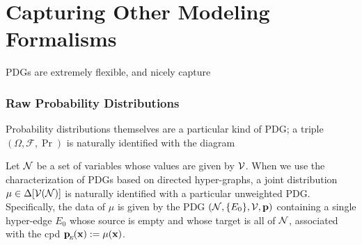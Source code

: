 \documentclass{article}
\begin{document}
%
	

	\part{Capturing Other Modeling Formalisms}
	PDGs are extremely flexible, and nicely capture 

    \section{Raw Probability Distributions}
	Probability distributions themselves are a particular kind of PDG; 
	a  triple $(\Omega, \mathcal F, \Pr)$ is naturally identified with the diagram
	\begin{center}
	\end{center}

		
    Let $\N$ be a set of variables whose values are given by $\V$. When we use the characterization of PDGs based on directed hyper-graphs, a joint distribution $\mu \in \Delta[\V(\N)]$ is naturally identified with a particular unweighted PDG. Specifically, the data of $\mu$ is given by the PDG $(\N, \{ E_0 \}, \V, \mat p)$ containing a single hyper-edge $E_0$ whose source is empty and whose target is all of $\N$, associated with the cpd $\bp[E](\mat x) := \mu(\mat x)$.
\end{document}
